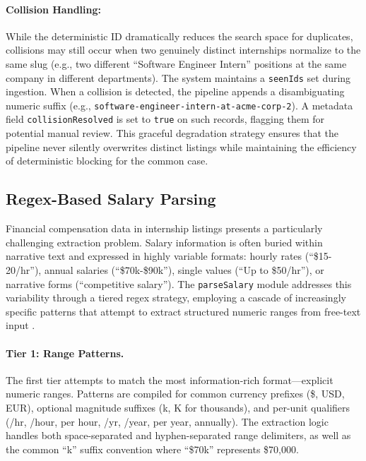 \paragraph{Collision Handling:} While the deterministic ID dramatically reduces the search space for duplicates, collisions may still occur when two genuinely distinct internships normalize to the same slug (e.g., two different ``Software Engineer Intern'' positions at the same company in different departments). The system maintains a \texttt{seenIds} set during ingestion. When a collision is detected, the pipeline appends a disambiguating numeric suffix (e.g., \texttt{software-engineer-intern-at-acme-corp-2}). A metadata field \texttt{collisionResolved} is set to \texttt{true} on such records, flagging them for potential manual review. This graceful degradation strategy ensures that the pipeline never silently overwrites distinct listings while maintaining the efficiency of deterministic blocking for the common case.

\subsection{Regex-Based Salary Parsing}

Financial compensation data in internship listings presents a particularly challenging extraction problem. Salary information is often buried within narrative text and expressed in highly variable formats: hourly rates (``\$15-20/hr''), annual salaries (``\$70k-\$90k''), single values (``Up to \$50/hr''), or narrative forms (``competitive salary''). The \texttt{parseSalary} module addresses this variability through a tiered regex strategy, employing a cascade of increasingly specific patterns that attempt to extract structured numeric ranges from free-text input \cite{sarawagi2008information}.

\paragraph{Tier 1: Range Patterns.} The first tier attempts to match the most information-rich format—explicit numeric ranges. Patterns are compiled for common currency prefixes (\$, USD, EUR), optional magnitude suffixes (k, K for thousands), and per-unit qualifiers (/hr, /hour, per hour, /yr, /year, per year, annually). The extraction logic handles both space-separated and hyphen-separated range delimiters, as well as the common ``k'' suffix convention where ``\$70k'' represents \$70,000.

